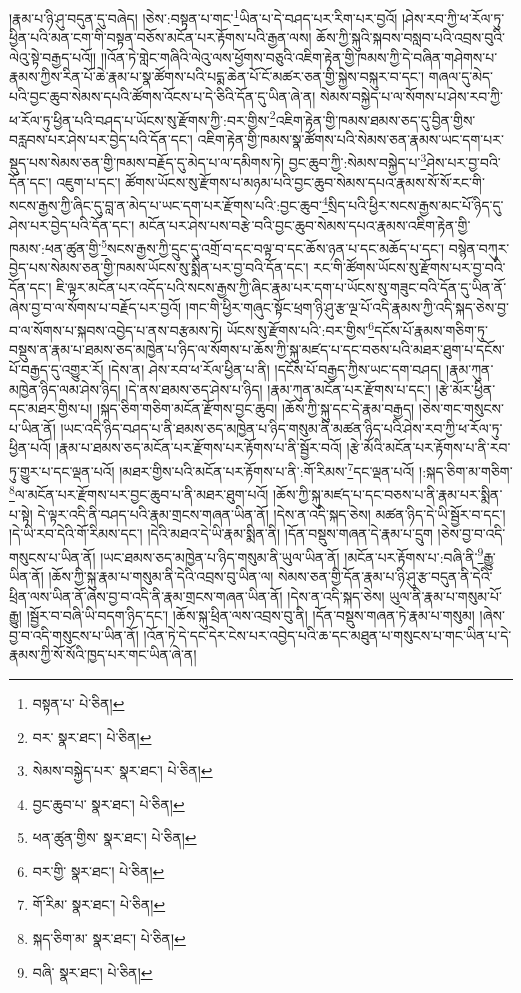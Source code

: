 །རྣམ་པ་ཉི་ཤུ་བདུན་དུ་བཞེད། །ཅེས་:བསྟན་པ་གང་\footnote{བསྟན་པ་  པེ་ཅིན། }ཡིན་པ་དེ་བཤད་པར་རིག་པར་བྱའོ། །ཤེས་རབ་ཀྱི་ཕ་རོལ་ཏུ་ཕྱིན་པའི་མན་ངག་གི་བསྟན་བཅོས་མངོན་པར་རྟོགས་པའི་རྒྱན་ལས། ཆོས་ཀྱི་སྐུའི་སྐབས་བསླབ་པའི་འབྲས་བུའི་ལེའུ་སྟེ་བརྒྱད་པའོ།། །།འོན་ཏེ་གླེང་གཞིའི་ལེའུ་ལས་ཕྱོགས་བཅུའི་འཇིག་རྟེན་གྱི་ཁམས་ཀྱི་དེ་བཞིན་གཤེགས་པ་རྣམས་ཀྱིས་རིན་པོ་ཆེ་རྣམ་པ་སྣ་ཚོགས་པའི་པདྨ་ཆེན་པོ་ངོ་མཚར་ཅན་གྱི་སྐྱེས་བསྐུར་བ་དང་། གཞལ་དུ་མེད་པའི་བྱང་ཆུབ་སེམས་དཔའི་ཚོགས་འོངས་པ་དེ་ཅིའི་དོན་དུ་ཡིན་ཞེ་ན། སེམས་བསྐྱེད་པ་ལ་སོགས་པ་ཤེས་རབ་ཀྱི་ཕ་རོལ་ཏུ་ཕྱིན་པའི་བཤད་པ་ཡོངས་སུ་རྫོགས་ཀྱི་:བར་གྱིས་\footnote{བར་  སྣར་ཐང་།  པེ་ཅིན། }འཇིག་རྟེན་གྱི་ཁམས་ཐམས་ཅད་དུ་བྱིན་གྱིས་བརླབས་པར་ཤེས་པར་བྱེད་པའི་དོན་དང་། འཇིག་རྟེན་གྱི་ཁམས་སྣ་ཚོགས་པའི་སེམས་ཅན་རྣམས་ཡང་དག་པར་སྡུད་པས་སེམས་ཅན་གྱི་ཁམས་བརྗོད་དུ་མེད་པ་ལ་དམིགས་ཏེ། བྱང་ཆུབ་ཀྱི་:སེམས་བསྐྱེད་པ་\footnote{སེམས་བསྐྱེད་པར་  སྣར་ཐང་།  པེ་ཅིན། }ཤེས་པར་བྱ་བའི་དོན་དང་། འཇུག་པ་དང་། ཚོགས་ཡོངས་སུ་རྫོགས་པ་མཉམ་པའི་བྱང་ཆུབ་སེམས་དཔའ་རྣམས་སོ་སོ་རང་གི་སངས་རྒྱས་ཀྱི་ཞིང་དུ་བླ་ན་མེད་པ་ཡང་དག་པར་རྫོགས་པའི་:བྱང་ཆུབ་\footnote{བྱང་ཆུབ་པ་  སྣར་ཐང་།  པེ་ཅིན། }སྲིད་པའི་ཕྱིར་སངས་རྒྱས་མང་པོ་ཉིད་དུ་ཤེས་པར་བྱེད་པའི་དོན་དང་། མངོན་པར་ཤེས་པས་བརྩེ་བའི་བྱང་ཆུབ་སེམས་དཔའ་རྣམས་འཇིག་རྟེན་གྱི་ཁམས་:ཕན་ཚུན་གྱི་\footnote{ཕན་ཚུན་གྱིས་  སྣར་ཐང་།  པེ་ཅིན། }སངས་རྒྱས་ཀྱི་དྲུང་དུ་འགྲོ་བ་དང་བལྟ་བ་དང་ཆོས་ཉན་པ་དང་མཆོད་པ་དང་། བསྙེན་བཀུར་བྱེད་པས་སེམས་ཅན་གྱི་ཁམས་ཡོངས་སུ་སྨིན་པར་བྱ་བའི་དོན་དང་། རང་གི་ཚོགས་ཡོངས་སུ་རྫོགས་པར་བྱ་བའི་དོན་དང་། ཇི་ལྟར་མངོན་པར་འདོད་པའི་སངས་རྒྱས་ཀྱི་ཞིང་རྣམ་པར་དག་པ་ཡོངས་སུ་གཟུང་བའི་དོན་དུ་ཡིན་ནོ་ཞེས་བྱ་བ་ལ་སོགས་པ་བརྗོད་པར་བྱའོ། །གང་གི་ཕྱིར་གཞུང་སྟོང་ཕྲག་ཉི་ཤུ་རྩ་ལྔ་པོ་འདི་རྣམས་ཀྱི་འདི་སྐད་ཅེས་བྱ་བ་ལ་སོགས་པ་སྐབས་འབྱེད་པ་ནས་བརྩམས་ཏེ། ཡོངས་སུ་རྫོགས་པའི་:བར་གྱིས་\footnote{བར་གྱི་  སྣར་ཐང་།  པེ་ཅིན། }དངོས་པོ་རྣམས་གཅིག་ཏུ་བསྡུས་ན་རྣམ་པ་ཐམས་ཅད་མཁྱེན་པ་ཉིད་ལ་སོགས་པ་ཆོས་ཀྱི་སྐུ་མཛད་པ་དང་བཅས་པའི་མཐར་ཐུག་པ་དངོས་པོ་བརྒྱད་དུ་འགྱུར་རོ། །དེས་ན། ཤེས་རབ་ཕ་རོལ་ཕྱིན་པ་ནི། །དངོས་པོ་བརྒྱད་ཀྱིས་ཡང་དག་བཤད། །རྣམ་ཀུན་མཁྱེན་ཉིད་ལམ་ཤེས་ཉིད། །དེ་ནས་ཐམས་ཅད་ཤེས་པ་ཉིད། །རྣམ་ཀུན་མངོན་པར་རྫོགས་པ་དང་། །རྩེ་མོར་ཕྱིན་དང་མཐར་གྱིས་པ། །སྐད་ཅིག་གཅིག་མངོན་རྫོགས་བྱང་ཆུབ། །ཆོས་ཀྱི་སྐུ་དང་དེ་རྣམ་བརྒྱད། །ཅེས་གང་གསུངས་པ་ཡིན་ནོ། །ཡང་འདི་ཉིད་བཤད་པ་ནི་ཐམས་ཅད་མཁྱེན་པ་ཉིད་གསུམ་ནི་མཚན་ཉིད་པའི་ཤེས་རབ་ཀྱི་ཕ་རོལ་ཏུ་ཕྱིན་པའོ། །རྣམ་པ་ཐམས་ཅད་མངོན་པར་རྫོགས་པར་རྟོགས་པ་ནི་སྦྱོར་བའོ། །རྩེ་མོའི་མངོན་པར་རྟོགས་པ་ནི་རབ་ཏུ་གྱུར་པ་དང་ལྡན་པའོ། །མཐར་གྱིས་པའི་མངོན་པར་རྟོགས་པ་ནི་:གོ་རིམས་\footnote{གོ་རིམ་  སྣར་ཐང་།  པེ་ཅིན། }དང་ལྡན་པའོ། །:སྐད་ཅིག་མ་གཅིག་\footnote{སྐད་ཅིག་མ་  སྣར་ཐང་།  པེ་ཅིན། }ལ་མངོན་པར་རྫོགས་པར་བྱང་ཆུབ་པ་ནི་མཐར་ཐུག་པའོ། །ཆོས་ཀྱི་སྐུ་མཛད་པ་དང་བཅས་པ་ནི་རྣམ་པར་སྨིན་པ་སྟེ། དེ་ལྟར་འདི་ནི་བཤད་པའི་རྣམ་གྲངས་གཞན་ཡིན་ནོ། །དེས་ན་འདི་སྐད་ཅེས། མཚན་ཉིད་དེ་ཡི་སྦྱོར་བ་དང་། །དེ་ཡི་རབ་དེའི་གོ་རིམས་དང་། །དེའི་མཐའ་དེ་ཡི་རྣམ་སྨིན་ནི། །དོན་བསྡུས་གཞན་དེ་རྣམ་པ་དྲུག །ཅེས་བྱ་བ་འདི་གསུངས་པ་ཡིན་ནོ། །ཡང་ཐམས་ཅད་མཁྱེན་པ་ཉིད་གསུམ་ནི་ཡུལ་ཡིན་ནོ། །མངོན་པར་རྟོགས་པ་:བཞི་ནི་\footnote{བཞི་  སྣར་ཐང་།  པེ་ཅིན། }རྒྱུ་ཡིན་ནོ། །ཆོས་ཀྱི་སྐུ་རྣམ་པ་གསུམ་ནི་དེའི་འབྲས་བུ་ཡིན་ལ། སེམས་ཅན་གྱི་དོན་རྣམ་པ་ཉི་ཤུ་རྩ་བདུན་ནི་དེའི་ཕྲིན་ལས་ཡིན་ནོ་ཞེས་བྱ་བ་འདི་ནི་རྣམ་གྲངས་གཞན་ཡིན་ནོ། །དེས་ན་འདི་སྐད་ཅེས། ཡུལ་ནི་རྣམ་པ་གསུམ་པོ་རྒྱུ། །སྦྱོར་བ་བཞི་ཡི་བདག་ཉིད་དང་། །ཆོས་སྐུ་ཕྲིན་ལས་འབྲས་བུ་ནི། །དོན་བསྡུས་གཞན་ཏེ་རྣམ་པ་གསུམ། །ཞེས་བྱ་བ་འདི་གསུངས་པ་ཡིན་ནོ། །འོན་ཏེ་དེ་དང་དེར་ངེས་པར་འབྱེད་པའི་ཆ་དང་མཐུན་པ་གསུངས་པ་གང་ཡིན་པ་དེ་རྣམས་ཀྱི་སོ་སོའི་ཁྱད་པར་གང་ཡིན་ཞེ་ན། 